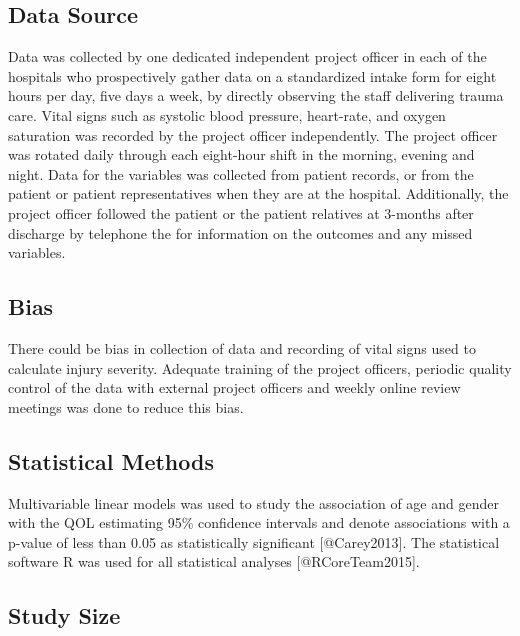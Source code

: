 \documentclass[
]{article}
\begin{document}
\hypertarget{data-source}{%
\subsection{Data Source}\label{data-source}}

Data was collected by one dedicated independent project officer in each
of the hospitals who prospectively gather data on a standardized intake
form for eight hours per day, five days a week, by directly observing
the staff delivering trauma care. Vital signs such as systolic blood
pressure, heart-rate, and oxygen saturation was recorded by the project
officer independently. The project officer was rotated daily through
each eight-hour shift in the morning, evening and night. Data for the
variables was collected from patient records, or from the patient or
patient representatives when they are at the hospital. Additionally, the
project officer followed the patient or the patient relatives at
3-months after discharge by telephone the for information on the
outcomes and any missed variables.

\hypertarget{bias}{%
\subsection{Bias}\label{bias}}

There could be bias in collection of data and recording of vital signs
used to calculate injury severity. Adequate training of the project
officers, periodic quality control of the data with external project
officers and weekly online review meetings was done to reduce this bias.

\hypertarget{statistical-methods}{%
\subsection{Statistical Methods}\label{statistical-methods}}

Multivariable linear models was used to study the association of age and
gender with the QOL estimating 95\% confidence intervals and denote
associations with a p-value of less than 0.05 as statistically
significant {[}@Carey2013{]}. The statistical software R was used for
all statistical analyses {[}@RCoreTeam2015{]}.

\hypertarget{study-size}{%
\subsection{Study Size}\label{study-size}}
\end{document}
